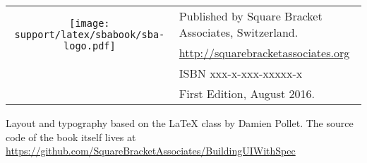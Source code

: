 \documentclass[10pt,twoside,english]{support/latex/sbabook/sbabook}
\begin{document}
{  \vfill

  \begin{tabular}{@{}c@{\quad}l}
    \multirow{2}{*}{\texttt{[image: support/latex/sbabook/sba-logo.pdf]}}
    & Published by Square Bracket Associates, Switzerland. \\
    & \url{http://squarebracketassociates.org} \\[\smallskipamount]
    & ISBN xxx-x-xxx-xxxxx-x \\
    & First Edition, August 2016.\\
  \end{tabular}
  \medskip

  Layout and typography based on the
   \LaTeX{} class by Damien Pollet. The source code
  of the book itself lives at
  \url{https://github.com/SquareBracketAssociates/BuildingUIWithSpec} }


\frontmatter
\pagestyle{plain}

\tableofcontents*
\clearpage\listoffigures


\mainmatter













\backmatter
\end{document}

